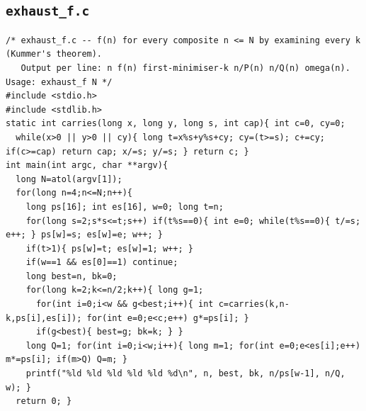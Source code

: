 \documentclass[11pt,a4paper]{article}
\theoremstyle{definition}
\begin{document}
\subsection{\texttt{exhaust\_f.c}}
\begin{lstlisting}
/* exhaust_f.c -- f(n) for every composite n <= N by examining every k (Kummer's theorem).
   Output per line: n f(n) first-minimiser-k n/P(n) n/Q(n) omega(n).   Usage: exhaust_f N */
#include <stdio.h>
#include <stdlib.h>
static int carries(long x, long y, long s, int cap){ int c=0, cy=0;
  while(x>0 || y>0 || cy){ long t=x%s+y%s+cy; cy=(t>=s); c+=cy; if(c>=cap) return cap; x/=s; y/=s; } return c; }
int main(int argc, char **argv){
  long N=atol(argv[1]);
  for(long n=4;n<=N;n++){
    long ps[16]; int es[16], w=0; long t=n;
    for(long s=2;s*s<=t;s++) if(t%s==0){ int e=0; while(t%s==0){ t/=s; e++; } ps[w]=s; es[w]=e; w++; }
    if(t>1){ ps[w]=t; es[w]=1; w++; }
    if(w==1 && es[0]==1) continue;
    long best=n, bk=0;
    for(long k=2;k<=n/2;k++){ long g=1;
      for(int i=0;i<w && g<best;i++){ int c=carries(k,n-k,ps[i],es[i]); for(int e=0;e<c;e++) g*=ps[i]; }
      if(g<best){ best=g; bk=k; } }
    long Q=1; for(int i=0;i<w;i++){ long m=1; for(int e=0;e<es[i];e++) m*=ps[i]; if(m>Q) Q=m; }
    printf("%ld %ld %ld %ld %ld %d\n", n, best, bk, n/ps[w-1], n/Q, w); }
  return 0; }
\end{lstlisting}
\end{document}
